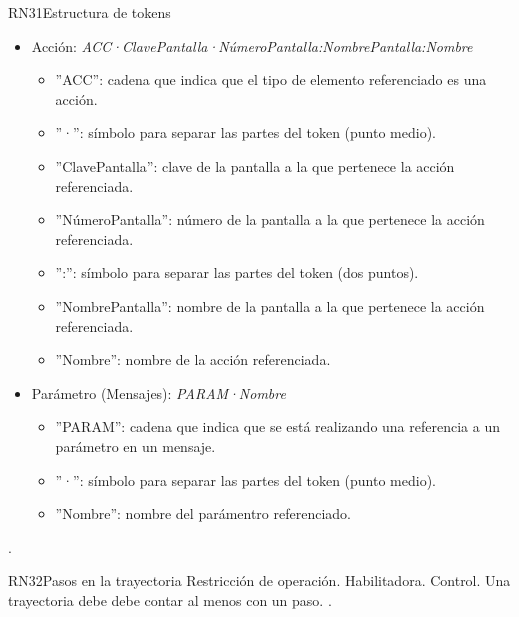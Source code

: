\begin{BussinesRule}{RN31}{Estructura de tokens}
\begin{itemize}
\begin{itemize}
			\item '':'': símbolo para separar las partes del token (dos puntos).
			\item ''NombreCasoUso'': nombre del caso de uso al que pertenece el paso referenciado.
			\item ''ClaveTrayectoria'': clave de la trayectoria a la que pertenece el paso referenciado.
			\item ''Número'': número del paso referenciado.
		\end{itemize}
	\item Acción: {\em ACC·ClavePantalla·NúmeroPantalla:NombrePantalla:Nombre}
		\begin{itemize}
			\item ''ACC'': cadena que indica que el tipo de elemento referenciado es una acción.
			\item ''·'':  símbolo para separar las partes del token (punto medio).
			\item ''ClavePantalla'': clave de la pantalla a la que pertenece la acción referenciada.
			\item ''NúmeroPantalla'': número de la pantalla a la que pertenece la acción referenciada.
			\item '':'': símbolo para separar las partes del token (dos puntos).
			\item ''NombrePantalla'': nombre de la pantalla a la que pertenece la acción referenciada.
			\item ''Nombre'': nombre de la acción referenciada.
		\end{itemize}
	\item Parámetro (Mensajes): {\em PARAM·Nombre}
		\begin{itemize}
			\item ''PARAM'': cadena que indica que se está realizando una referencia a un parámetro en un mensaje.
			\item ''·'':  símbolo para separar las partes del token (punto medio).
			\item ''Nombre'': nombre del parámentro referenciado.
		\end{itemize}
	\end{itemize}
	 . 
\end{BussinesRule}


\begin{BussinesRule}{RN32}{Pasos en la trayectoria} 
	\BRitem[Tipo:] Restricción de operación. 
	\BRitem[Clase:] Habilitadora. 
	\BRitem[Nivel:] Control. %
	\BRitem[Descripción:] Una trayectoria debe debe contar al menos con un paso.
	 \UCref{}{}. 
\end{BussinesRule}

